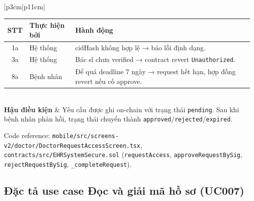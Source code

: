 \documentclass[../DoAn]{subfiles}
\begin{document}
\begin{table}[H]
\begin{tabular}{|p{3cm}|p{11cm}|}
\begin{tabular}{|c|p{2.3cm}|p{6cm}|}
\hline
\textbf{STT} & \textbf{Thực hiện bởi} & \textbf{Hành động} \\ \hline
1a & Hệ thống & cidHash không hợp lệ → báo lỗi định dạng. \\ \hline
3a & Hệ thống & Bác sĩ chưa verified → contract revert \texttt{Unauthorized}. \\ \hline
8a & Bệnh nhân & Để quá deadline 7 ngày → request hết hạn, hợp đồng revert nếu cố approve. \\ \hline
\end{tabular} \\ \hline
\textbf{Hậu điều kiện} & Yêu cầu được ghi on-chain với trạng thái \texttt{pending}. Sau khi bệnh nhân phản hồi, trạng thái chuyển thành \texttt{approved}/\texttt{rejected}/\texttt{expired}. \\ \hline
\end{tabular}
\end{table}

Code reference: \texttt{mobile/src/screens-v2/doctor/DoctorRequestAccessScreen.tsx}, \texttt{contracts/src/EHRSystemSecure.sol} (\texttt{requestAccess}, \texttt{approveRequestBySig}, \texttt{rejectRequestBySig}, \texttt{\_completeRequest}).

\subsection{Đặc tả use case Đọc và giải mã hồ sơ (UC007)}
\end{document}

